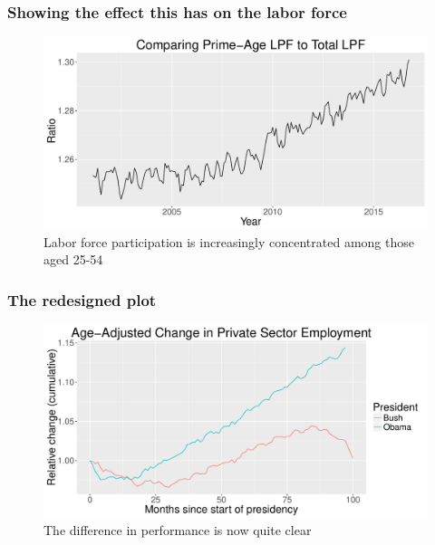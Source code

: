 \documentclass{beamer}
\begin{document}
\frame
{
  \frametitle{Showing the effect this has on the labor force}

\begin{figure}[htbp]
\begin{center}
\includegraphics[scale=0.3]{Ratio_plot}
\caption{Labor force participation is increasingly concentrated among those aged 25-54}
\end{center}
\end{figure}


}
\frame
{
  \frametitle{The redesigned plot}

\begin{figure}[htbp]
\begin{center}
\includegraphics[scale=0.3]{Main_plot.pdf}
\caption{The difference in performance is now quite clear}
\end{center}
\end{figure}


}
\end{document}
